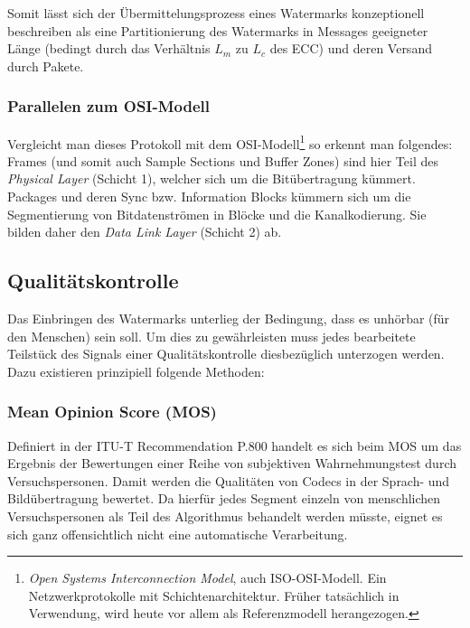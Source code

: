 Somit lässt sich der Übermittelungsprozess eines Watermarks konzeptionell beschreiben als eine Partitionierung des Watermarks in Messages geeigneter Länge (bedingt durch das Verhältnis $L_m$ zu $L_c$ des ECC) und deren Versand durch Pakete.

\subsubsection{Parallelen zum OSI-Modell}

Vergleicht man dieses Protokoll mit dem OSI-Modell\footnote{\textit{Open Systems Interconnection Model}, auch ISO-OSI-Modell. Ein Netzwerkprotokolle mit Schichtenarchitektur. Früher tatsächlich in Verwendung, wird heute vor allem als Referenzmodell herangezogen.} so erkennt man folgendes: Frames (und somit auch Sample Sections und Buffer Zones) sind hier Teil des \textit{Physical Layer} (Schicht 1), welcher sich um die Bitübertragung kümmert. Packages und deren Sync bzw. Information Blocks kümmern sich um  die Segmentierung von Bitdatenströmen in Blöcke und die Kanalkodierung. Sie bilden daher den \textit{Data Link Layer} (Schicht 2) ab.
 
\subsection{Qualitätskontrolle}
\label{sec:qualitaetskontrolle}

Das Einbringen des Watermarks unterlieg der Bedingung, dass es unhörbar (für den Menschen) sein soll. Um dies zu gewährleisten muss jedes bearbeitete Teilstück des Signals einer Qualitätskontrolle diesbezüglich unterzogen werden. Dazu existieren prinzipiell folgende Methoden:

\subsubsection{Mean Opinion Score (MOS)}

Definiert in der ITU-T Recommendation P.800\cite{rec1996p} handelt es sich beim MOS um das Ergebnis der Bewertungen einer Reihe von subjektiven Wahrnehmungstest durch Versuchspersonen. Damit werden die Qualitäten von Codecs in der Sprach- und Bildübertragung bewertet. Da hierfür jedes Segment einzeln von menschlichen Versuchspersonen als Teil des Algorithmus behandelt werden müsste, eignet es sich ganz offensichtlich nicht eine automatische Verarbeitung. 

